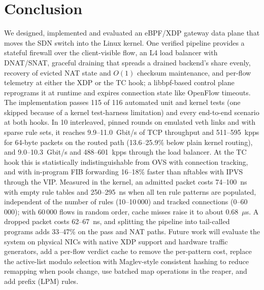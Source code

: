 \documentclass[conference]{IEEEtran}
\begin{document}
\section{Conclusion}
We designed, implemented and evaluated an eBPF/XDP gateway data plane that
moves the SDN switch into the Linux kernel. One verified pipeline provides a
stateful firewall over the client-visible flow, an L4 load balancer with
DNAT/SNAT, graceful draining that spreads a drained backend's share evenly,
recovery of evicted NAT state and $O(1)$ checksum maintenance, and per-flow
telemetry at either the XDP or the TC hook; a libbpf-based control plane
reprograms it at runtime and expires connection state like OpenFlow
timeouts. The implementation passes 115 of 116 automated unit and kernel
tests (one skipped because of a kernel test-harness limitation) and every
end-to-end scenario at both hooks. In 10 interleaved, pinned rounds on
emulated veth links and with sparse rule sets, it reaches 9.9--11.0~Gbit/s
of TCP throughput and 511--595~kpps for 64-byte packets on the routed path
(13.6--25.9\% below plain kernel routing), and 9.0--10.3~Gbit/s and
488--601~kpps through the load balancer. At the TC hook this is
statistically indistinguishable from OVS with connection tracking, and with
in-program FIB forwarding 16--18\% faster than nftables with IPVS through
the VIP. Measured in the kernel, an admitted packet costs 74--100~ns with
empty rule tables and 250--295~ns when all ten rule patterns are populated,
independent of the number of rules (10--10\,000) and tracked connections
(0--60\,000); with 60\,000 flows in random order, cache misses raise it to
about 0.68~$\mu$s. A dropped packet costs 62--67~ns, and splitting the
pipeline into tail-called programs adds 33--47\% on the pass and NAT paths.
Future work will evaluate the system on physical NICs with native XDP support
and hardware traffic generators, add a per-flow verdict cache to remove the
per-pattern cost, replace the active-list modulo selection with Maglev-style
consistent hashing \cite{eisenbud2016maglev} to reduce remapping when pools
change, use batched map operations in the reaper, and add prefix (LPM) rules.


\end{document}
